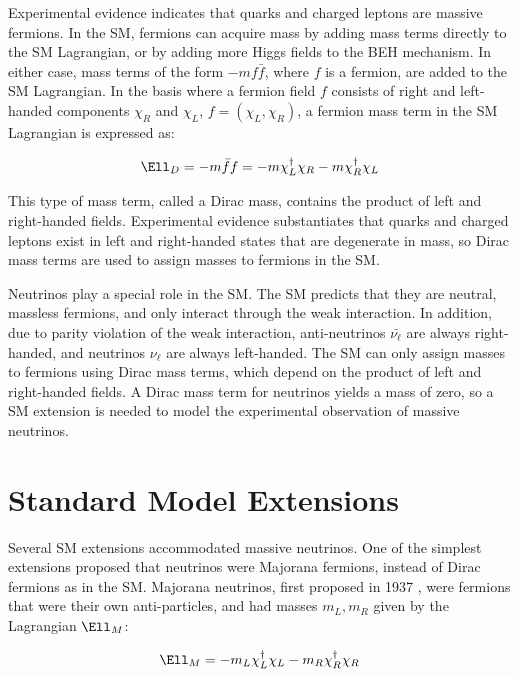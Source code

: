 Experimental evidence indicates that quarks and charged leptons are massive fermions.  In the SM, fermions 
can acquire mass by adding mass terms directly to the SM Lagrangian, or by adding more Higgs fields to the 
BEH mechanism.  In either case, mass terms of the form $-mf\bar{f}$, where $f$ is a fermion, are added to 
the SM Lagrangian.  In the basis where a fermion field $f$ consists of right and left-handed components $\chi_{R}$ 
and $\chi_{L}$, $f = (\chi_{L},\chi_{R})$, a fermion mass term in the SM Lagrangian is expressed as:

\begin{equation}
	\Ell_{D} = -m\bar{f}f = -m\chi^{\dagger}_{L}\chi_{R} - m\chi^{\dagger}_{R}\chi_{L}
\end{equation}

This type of mass term, called a Dirac mass, contains the product of left and right-handed fields.  Experimental 
evidence substantiates that quarks and charged leptons exist in left and right-handed states that are degenerate 
in mass, so Dirac mass terms are used to assign masses to fermions in the SM.

Neutrinos play a special role in the SM.  The SM predicts that they are neutral, massless fermions, and only interact 
through the weak interaction.  In addition, due to parity violation of the weak interaction, 
anti-neutrinos $\bar{\nu_{\ell}}$ are always right-handed, and neutrinos $\nu_{\ell}$ are always left-handed.  
The SM can only assign masses to fermions using Dirac mass terms, which depend on the product of left and 
right-handed fields.  A Dirac mass term for neutrinos yields a mass of zero, so a SM extension is needed 
to model the experimental observation of massive neutrinos.


\section{Standard Model Extensions}
\label{sec:lrsExtensions}
Several SM extensions accommodated massive neutrinos.  One of the simplest extensions proposed that neutrinos 
were Majorana fermions, instead of Dirac fermions as in the SM.  Majorana neutrinos, first proposed 
in 1937 \cite{majoranaTheory}, were fermions that were their own anti-particles, and had masses 
$m_{L},m_{R}$ given by the Lagrangian $\Ell_{M}$:

\begin{equation}
	\Ell_{M} = -m_{L}\chi^{\dagger}_{L}\chi_{L} - m_{R}\chi^{\dagger}_{R}\chi_{R}
\end{equation}

